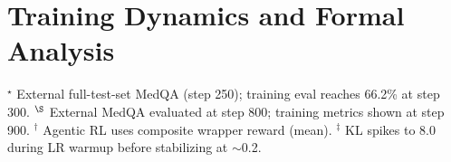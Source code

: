 \documentclass{article}
\begin{document}
\section{Training Dynamics and Formal Analysis}
\label{app:dynamics}

\begin{table}[h]
\centering
\caption{Training dynamics across RL configurations. Clip ratio is always 0.0 in online single-iteration GRPO (importance ratio $\equiv 1.0$ by construction). The key metric differentiating configurations is KL divergence, which reflects the magnitude of policy change.}
\label{tab:training_dynamics}
\vspace{2pt}
{\footnotesize $^\star$ External full-test-set MedQA (step 250); training eval reaches 66.2\% at step 300. $^\S$ External MedQA evaluated at step 800; training metrics shown at step 900. $^\dagger$ Agentic RL uses composite wrapper reward (mean). $^\ddagger$ KL spikes to 8.0 during LR warmup before stabilizing at $\sim$0.2.}
\end{table}
\end{document}
